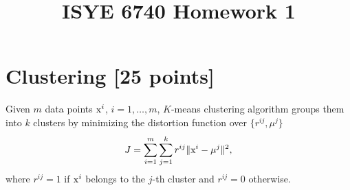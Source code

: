 \documentclass[twoside,10pt]{article}
\begin{document}
\title{ISYE 6740 Homework 1}
\date{}

\maketitle



\section{Clustering [25 points]}



Given $m$ data points $\text x^i$, $i=1,\dots, m$, $K$-means clustering algorithm groups them into $k$ clusters by minimizing the distortion function over $\{ r^{ij}, \mu^j \}$
$$J=\sum_{i=1}^m\sum_{j=1}^k r^{ij} \|\text x^i-\mu^j\|^2,$$
where $r^{ij}=1$ if $\text x^i$ belongs to the $j$-th cluster and $r^{ij}=0$ otherwise.
\end{document}
